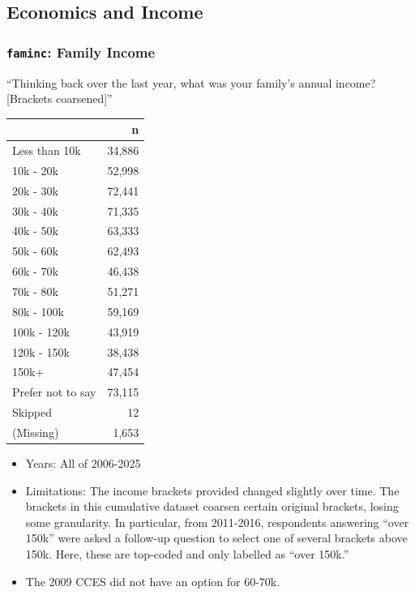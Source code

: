 \documentclass[10pt,article,oneside]{memoir}
\begin{document}
\subsection{Economics and Income}\label{economics-and-income}

\subsubsection{\texorpdfstring{\texttt{faminc}: Family
Income}{faminc: Family Income}}\label{faminc-family-income}

``Thinking back over the last year, what was your family's annual
income? {[}Brackets coarsened{]}''

\begin{table}[H]
\centering
\begin{tabular}[t]{lr}
\toprule
 & n\\
\midrule
Less than 10k & 34,886\\
10k - 20k & 52,998\\
20k - 30k & 72,441\\
30k - 40k & 71,335\\
40k - 50k & 63,333\\
50k - 60k & 62,493\\
60k - 70k & 46,438\\
70k - 80k & 51,271\\
80k - 100k & 59,169\\
100k - 120k & 43,919\\
120k - 150k & 38,438\\
150k+ & 47,454\\
Prefer not to say & 73,115\\
Skipped & 12\\
(Missing) & 1,653\\
\bottomrule
\end{tabular}
\end{table}

\begin{itemize}
\tightlist
\item
  Years: All of 2006-2025
\item
  Limitations: The income brackets provided changed slightly over time.
  The brackets in this cumulative dataset coarsen certain original
  brackets, losing some granularity. In particular, from 2011-2016,
  respondents answering ``over 150k'' were asked a follow-up question to
  select one of several brackets above 150k. Here, these are top-coded
  and only labelled as ``over 150k.''
\item
  The 2009 CCES did not have an option for 60-70k.
\end{itemize}
\end{document}
